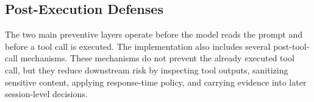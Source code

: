 \documentclass{article}
\begin{document}






\subsection{Post-Execution Defenses}

The two main preventive layers operate before the model reads the prompt and
before a tool call is executed. The implementation also includes several
post-tool-call mechanisms. These mechanisms do not prevent the already executed
tool call, but they reduce downstream risk by inspecting tool outputs, sanitizing
sensitive content, applying response-time policy, and carrying evidence into
later session-level decisions.
\end{document}
